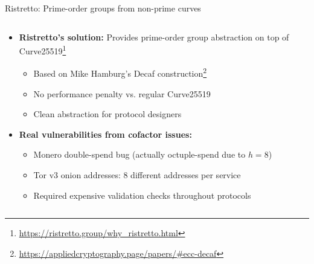 \documentclass[aspectratio=169, lualatex, handout]{beamer}
\begin{document}
\begin{frame}{Ristretto: Prime-order groups from non-prime curves}
	\begin{columns}[c]
		\begin{column}{1\textwidth}
			\begin{itemize}[<+->]
				\item \textbf{Ristretto's solution:} Provides prime-order group abstraction on top of Curve25519\footnote{\url{https://ristretto.group/why_ristretto.html}}
				      \begin{itemize}
					      \item Based on Mike Hamburg's Decaf construction\footnote{\url{https://appliedcryptography.page/papers/\#ecc-decaf}}
					      \item No performance penalty vs. regular Curve25519
					      \item Clean abstraction for protocol designers
				      \end{itemize}
				\item \textbf{Real vulnerabilities from cofactor issues:}
				      \begin{itemize}
					      \item Monero double-spend bug (actually octuple-spend due to $h=8$)
					      \item Tor v3 onion addresses: 8 different addresses per service
					      \item Required expensive validation checks throughout protocols
				      \end{itemize}
			\end{itemize}
		\end{column}
	\end{columns}
\end{frame}
\end{document}
